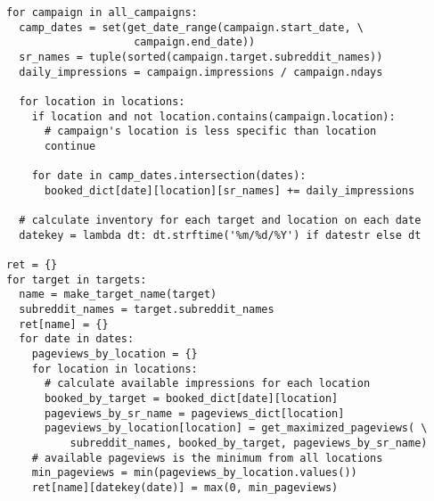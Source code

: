 \documentclass[11pt, a4paper]{article}
\begin{document}
\begin{lstlisting}[caption=\texttt{r2/lib/inventory.py} at lines 261-292]
for campaign in all_campaigns:
  camp_dates = set(get_date_range(campaign.start_date, \
					campaign.end_date))
  sr_names = tuple(sorted(campaign.target.subreddit_names))
  daily_impressions = campaign.impressions / campaign.ndays

  for location in locations:
    if location and not location.contains(campaign.location):
      # campaign's location is less specific than location
      continue

    for date in camp_dates.intersection(dates):
      booked_dict[date][location][sr_names] += daily_impressions

  # calculate inventory for each target and location on each date
  datekey = lambda dt: dt.strftime('%m/%d/%Y') if datestr else dt

ret = {}
for target in targets:
  name = make_target_name(target)
  subreddit_names = target.subreddit_names
  ret[name] = {}
  for date in dates:
    pageviews_by_location = {}
    for location in locations:
      # calculate available impressions for each location
      booked_by_target = booked_dict[date][location]
      pageviews_by_sr_name = pageviews_dict[location]
      pageviews_by_location[location] = get_maximized_pageviews( \
          subreddit_names, booked_by_target, pageviews_by_sr_name)
    # available pageviews is the minimum from all locations
    min_pageviews = min(pageviews_by_location.values())
    ret[name][datekey(date)] = max(0, min_pageviews)
\end{lstlisting}
\end{document}

